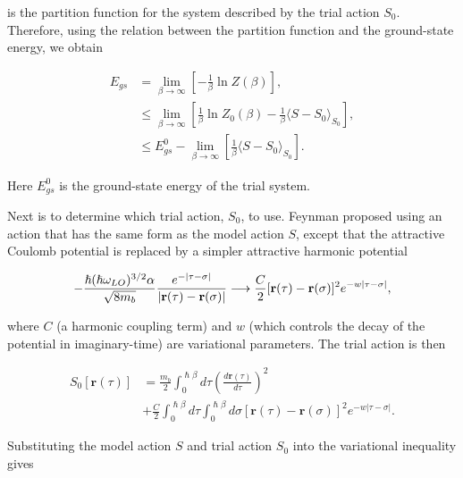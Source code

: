 is the partition function for the system described by the trial action $S_0$. Therefore, using the relation between the partition function and the ground-state energy, we obtain 

\begin{equation}
\begin{aligned}
    E_{gs} &= \lim_{\beta \to \infty} \left[-\frac{1}{\beta} \ln Z(\beta) \right] , \\
    &\leq \lim_{\beta \to \infty} \left[ \frac{1}{\beta} \ln Z_0(\beta) - \frac{1}{\beta} \langle S-S_0 \rangle_{S_0} \right] , \\ 
    &\leq E^0_{gs} - \lim_{\beta \to \infty} \left[ \frac{1}{\beta} \langle S-S_0 \rangle_{S_0} \right] .
\end{aligned}
\end{equation}

Here $E^0_{gs}$ is the ground-state energy of the trial system. 

Next is to determine which trial action, $S_0$, to use. Feynman proposed using an action that has the same form as the model action $S$, except that the attractive Coulomb potential is replaced by a simpler attractive harmonic potential 

\begin{equation}
     - \frac{ \hslash (\hslash \omega_{LO})^{3/2} \alpha}{\sqrt{8 m_b}} \frac{e^{-|\tau - \sigma|}}{|\mathbf{r}(\tau) - \mathbf{r}(\sigma)|} \longrightarrow \frac{C}{2} [\vb{r}(\tau) - \vb{r}(\sigma)]^2 e^{-w\abs{\tau - \sigma}},
\end{equation}

where $C$ (a harmonic coupling term) and $w$ (which controls the decay of the potential in imaginary-time) are variational parameters. The trial action is then

\begin{equation}
\begin{aligned}
        S_0[\mathbf{r}(\tau)] &= \frac{m_b}{2}\int^{\hslash\beta}_0 d\tau \left(\frac{d\mathbf{r}(\tau)}{d\tau}\right)^2\\
        &+ \frac{C}{2} \int^{\hslash\beta}_0 d\tau \int^{\hslash\beta}_0 d\sigma \left[\mathbf{r}(\tau) - \mathbf{r}(\sigma)\right]^2 e^{-w|\tau - \sigma|} .
\label{eqn:athermal_trial_action}
\end{aligned}
\end{equation}

Substituting the model action $S$ and trial action $S_0$ into the variational inequality gives

